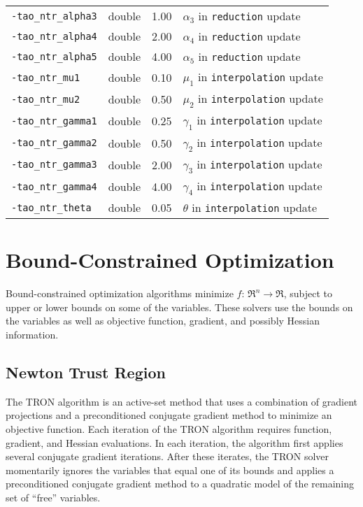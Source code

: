 \begin{table}[h]
\begin{tabular}{l|p{1.5in}|l|p{2.0in}}
{\tt -tao\_ntr\_alpha3} & double & 1.00 & $\alpha_3$ in {\tt reduction} update \\
{\tt -tao\_ntr\_alpha4} & double & 2.00 & $\alpha_4$ in {\tt reduction} update \\
{\tt -tao\_ntr\_alpha5} & double & 4.00 & $\alpha_5$ in {\tt reduction} update \\
{\tt -tao\_ntr\_mu1} & double & 0.10 & $\mu_1$ in {\tt interpolation} update \\
{\tt -tao\_ntr\_mu2} & double & 0.50 & $\mu_2$ in {\tt interpolation} update \\
{\tt -tao\_ntr\_gamma1} & double & 0.25 & $\gamma_1$ in {\tt interpolation} update \\
{\tt -tao\_ntr\_gamma2} & double & 0.50 & $\gamma_2$ in {\tt interpolation} update \\
{\tt -tao\_ntr\_gamma3} & double & 2.00 & $\gamma_3$ in {\tt interpolation} update \\
{\tt -tao\_ntr\_gamma4} & double & 4.00 & $\gamma_4$ in {\tt interpolation} update \\
{\tt -tao\_ntr\_theta} & double & 0.05 & $\theta$ in {\tt interpolation} update \\
\end{tabular}
\end{table}

\section{Bound-Constrained Optimization}
\label{chapter:bound}

Bound-constrained optimization algorithms
minimize $f: \, \Re^n \to \Re$, subject to upper or
lower bounds on some of the variables.
These solvers use the bounds on the variables as well as objective
function, gradient, and possibly Hessian information.

\subsection{Newton Trust Region}\label{sec:tron}  
The TRON \cite{lin_c3} algorithm is an active-set method that uses a 
combination of gradient projections and 
a preconditioned conjugate gradient method to minimize an objective function.
Each iteration of the TRON algorithm requires function, gradient, 
and Hessian evaluations.  In each iteration, the algorithm
first applies several conjugate gradient iterations.  
After these iterates, the TRON solver momentarily ignores the variables
that equal one of its bounds and
applies a preconditioned conjugate gradient method to a
quadratic model of the remaining set of ``free'' variables.  


